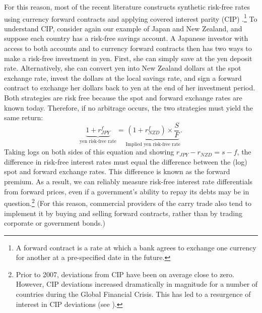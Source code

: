 \documentclass{ar-1col}
\begin{document}
\begin{textbox}[]
    For this reason, most of the recent literature constructs synthetic risk-free rates using currency forward contracts and applying covered interest parity (CIP) \citep{LustigRoussanovVerdelhan2011, DuSchreger2016}.\footnote{A forward contract is a rate at which a bank agrees to exchange one currency for another at a pre-specified date in the future.} To understand CIP, consider again our example of Japan and New Zealand, and suppose each country has a risk-free savings account. A Japanese investor with access to both accounts and to currency forward contracts then has two ways to make a risk-free investment in yen. First, she can simply save at the yen deposit rate. Alternatively, she can convert yen into New Zealand dollars at the spot exchange rate, invest the dollars at the local savings rate, and sign a forward contract to exchange her dollars back to yen at the end of her investment period. Both strategies are risk free because the spot and forward exchange rates are known today. Therefore, if no arbitrage occurs, the two strategies must yield the same return:
    \begin{equation}
    \underbrace{1 + r^f_{JPY}}_{\text{yen risk-free rate}}
    = \underbrace{
        (1 + r^f_{NZD}) \times \frac{S}{F}
    }_{\text{Implied yen risk-free rate}}.
    \label{eqn:CIP}
    \end{equation}
    Taking logs on both sides of this equation and showing $r_{JPY}-r_{NZD} = s - f$, the difference in risk-free interest rates must equal the difference between the (log) spot and forward exchange rates. This difference is known as the forward premium. As a result, we can reliably measure risk-free interest rate differentials from forward prices, even if a government's ability to repay its debts may be in question.\footnote{Prior to 2007, deviations from CIP have been on average close to zero. However, CIP deviations increased dramatically in magnitude for a number of countries during the Global Financial Crisis. This has led to a resurgence of interest in CIP deviations (see \citet{DuTepperVerdelhan2018}).} (For this reason, commercial providers of the carry trade also tend to implement it by buying and selling forward contracts, rather than by trading corporate or government bonds.)
\end{textbox}
\end{document}
